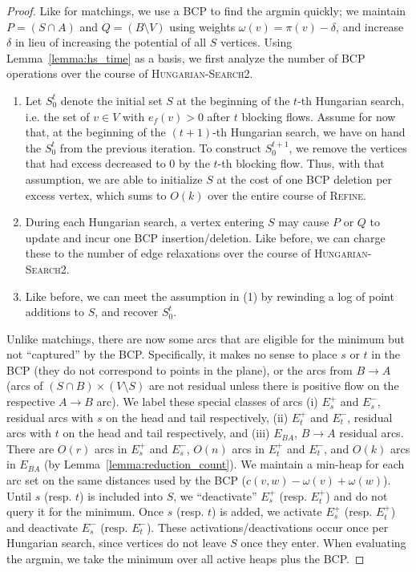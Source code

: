 \documentclass[11pt]{article}
\theoremstyle{plain}
\begin{document}
\begin{proof}
Like for matchings, we use a BCP to find the argmin quickly; we maintain
$P = (S \cap A)$ and $Q = (B \setminus V)$ using weights
$\omega(v) = \pi(v) - \delta$, and increase $\delta$ in lieu of increasing the
potential of all $S$ vertices.
Using Lemma~\ref{lemma:hs_time} as a basis, we first analyze the number of BCP
operations over the course of \textsc{Hungarian-Search2}.
\begin{enumerate}
\item Let $S^t_0$ denote the initial set $S$ at the beginning of the
	$t$-th Hungarian search, i.e. the set of $v \in V$ with
	$e_f(v) > 0$ after $t$ blocking flows.
	Assume for now that, at the beginning of the $(t+1)$-th
	Hungarian search, we have on hand the $S^t_0$ from the
	previous iteration.
	To construct $S^{t+1}_0$, we remove the vertices that had
	excess decreased to 0 by the $t$-th blocking flow.
	Thus, with that assumption, we are able to initialize $S$ at
	the cost of one BCP deletion per excess vertex, which sums to
	$O(k)$ over the entire course of \textsc{Refine}.
\item During each Hungarian search, a vertex entering $S$ may cause $P$
	or $Q$ to update and incur one BCP insertion/deletion.
	Like before, we can charge these to the number of edge
	relaxations over the course of \textsc{Hungarian-Search2}.
\item Like before, we can meet the assumption in (1) by rewinding a log
	of point additions to $S$, and recover $S^t_0$.
\end{enumerate}









Unlike matchings, there are now some arcs that are eligible for the
minimum but not ``captured'' by the BCP.
Specifically, it makes no sense to place $s$ or $t$ in the BCP
(they do not correspond to points in the plane), or the arcs from
$B \to A$ (arcs of $(S \cap B) \times (V \setminus S)$ are not residual
unless there is positive flow on the respective $A \to B$ arc).
We label these special classes of arcs (i) $E_s^+$ and $E_s^-$,
residual arcs with $s$ on the head and tail respectively, (ii)
$E_t^+$ and $E_t^-$, residual arcs with $t$ on the head and tail
respectively, and (iii) $E_{BA}$, $B \to A$ residual arcs.
There are $O(r)$ arcs in $E_s^+$ and $E_s^-$, $O(n)$ arcs in $E_t^+$
and $E_t^-$, and $O(k)$ arcs in $E_{BA}$
(by Lemma~\ref{lemma:reduction_count}).
We maintain a min-heap for each arc set on the same distances used
by the BCP ($c(v, w) - \omega(v) + \omega(w)$).
Until $s$ (resp. $t$) is included into $S$, we ``deactivate'' $E_s^+$
(resp. $E_t^+$) and do not query it for the minimum.
Once $s$ (resp. $t$) is added, we activate $E_s^+$ (resp. $E_t^+$) and
deactivate $E_s^-$ (resp. $E_t^-$).
These activations/deactivations occur once per Hungarian search, since
vertices do not leave $S$ once they enter.
When evaluating the argmin, we take the minimum over all active heaps
plus the BCP.


\end{proof}
\end{document}
